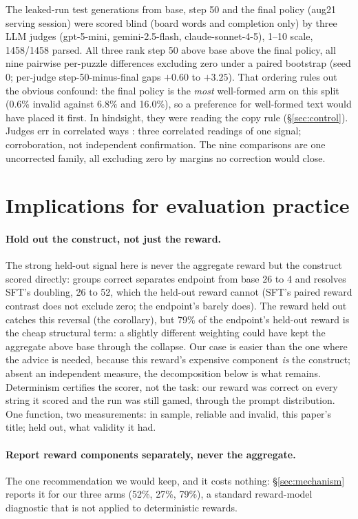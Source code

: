 \documentclass{article}
\begin{document}
The leaked-run test generations from base, step 50 and the final policy (aug21 serving session) were scored blind (board words and completion only) by three LLM judges (gpt-5-mini, gemini-2.5-flash, claude-sonnet-4-5), 1--10 scale, 1458/1458 parsed. All three rank step 50 above base
above the final policy, all nine pairwise per-puzzle differences excluding zero under a paired bootstrap (seed 0; per-judge step-50-minus-final gaps $+0.60$ to $+3.25$).
That ordering rules out the obvious confound: the final policy is the \emph{most} well-formed arm on this split (0.6\% invalid against 6.8\% and 16.0\%), so a preference for well-formed text would have placed it first. In hindsight, they were reading the copy rule (\S\ref{sec:control}).
Judges err in correlated ways \citep{kohli2026}: three correlated readings of one signal; corroboration, not independent confirmation. The nine comparisons are one uncorrected family, all excluding zero by margins no correction would close.

\section{Implications for evaluation practice}
\label{sec:implications}

\paragraph{Hold out the construct, not just the reward.} The strong held-out signal here is never the aggregate reward but the construct scored directly: groups correct separates endpoint from base 26 to 4 and resolves SFT's doubling, 26 to 52, which the held-out reward cannot (SFT's paired reward contrast does not exclude zero; the endpoint's barely does). The reward held out catches this reversal (the corollary), but 79\% of the endpoint's held-out reward is the cheap structural term: a slightly different weighting could have kept the aggregate above base through the collapse. Our case is easier than the one where the advice is needed, because this reward's expensive component \emph{is} the construct; absent an independent measure, the decomposition below is what remains. Determinism certifies the scorer, not the task: our reward was correct on every string it scored and the run was still gamed, through the prompt distribution. One function, two measurements: in sample, reliable and invalid, this paper's title; held out, what validity it had.

\paragraph{Report reward components separately, never the aggregate.} The one recommendation we would keep, and it costs nothing: \S\ref{sec:mechanism} reports it for our three arms (52\%, 27\%, 79\%), a standard reward-model diagnostic that is not applied to deterministic rewards.
\end{document}
